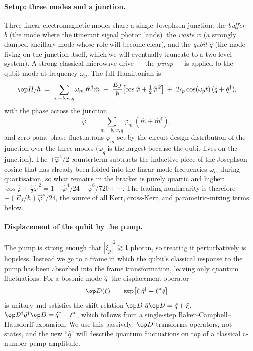 \paragraph{Setup: three modes and a junction.}
Three linear electromagnetic modes share a single Josephson junction:
the \emph{buffer} $\hat b$ (the mode where the itinerant signal photon
lands), the \emph{waste} $\hat w$ (a strongly damped ancillary mode
whose role will become clear), and the \emph{qubit} $\hat q$ (the
mode living on the junction itself, which we will eventually truncate
to a two-level system). A strong classical microwave drive --- the
\emph{pump} --- is applied to the qubit mode at frequency $\omega_p$.
The full Hamiltonian is
\begin{equation}
\label{eq:lescanne-Htot}
\op H/\hbar
\;=\; \sum_{m=b,w,q}\!\omega_m\,\hat m^\dagger\hat m
\;-\; \frac{E_J}{\hbar}\bigl[\cos\hat\varphi + \tfrac{1}{2}\hat\varphi^{\,2}\bigr]
\;+\; 2\epsilon_p\cos(\omega_p t)\,(\hat q+\hat q^\dagger),
\end{equation}
with the phase across the junction
\begin{equation}
\label{eq:lescanne-phi}
\hat\varphi \;=\; \sum_{m=b,w,q}\varphi_m\,(\hat m+\hat m^\dagger),
\end{equation}
and zero-point phase fluctuations $\varphi_m$ set by the
circuit-design distribution of the junction over the three modes
($\varphi_q$ is the largest because the qubit lives on the junction).
The $+\hat\varphi^2/2$ counterterm subtracts the inductive piece of
the Josephson cosine that has already been folded into the linear
mode frequencies $\omega_m$ during quantisation, so what remains in
the bracket is purely quartic and higher:
$\cos\hat\varphi+\tfrac{1}{2}\hat\varphi^{\,2}=1+\hat\varphi^4/24
-\hat\varphi^6/720+\cdots$. The leading nonlinearity is therefore
$-(E_J/\hbar)\,\hat\varphi^4/24$, the source of all Kerr, cross-Kerr,
and parametric-mixing terms below.

\paragraph{Displacement of the qubit by the pump.}
The pump is strong enough that $|\xi_p|^2\gtrsim 1$ photon, so
treating it perturbatively is hopeless. Instead we go to a frame in
which the qubit's classical response to the pump has been absorbed
into the frame transformation, leaving only quantum fluctuations. For
a bosonic mode $\hat q$, the displacement operator
\begin{equation}
\label{eq:lescanne-Dop}
\op D(\xi) \;=\; \exp\bigl[\xi\,\hat q^\dagger - \xi^*\hat q\bigr]
\end{equation}
is unitary and satisfies the shift relation
$\op D^\dagger\hat q\op D=\hat q+\xi$, $\op D^\dagger\hat q^\dagger\op D=\hat q^\dagger+\xi^*$,
which follows from a single-step Baker--Campbell--Hausdorff
expansion. We use this passively: $\op D$ transforms operators,
not states, and the new ``$\hat q$'' will describe quantum
fluctuations on top of a classical c-number pump amplitude.

